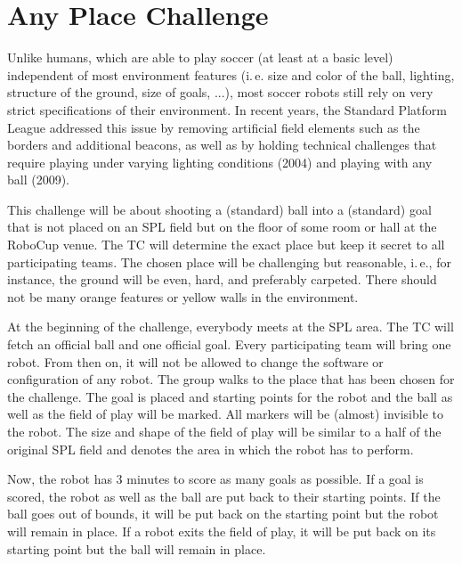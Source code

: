 \documentclass[12pt]{article}
\newcommand{\ie}{\mbox{i.\,e.}\xspace}
\begin{document}
\newpage






\section{Any Place Challenge}

Unlike humans, which are able to play soccer (at least at a basic level) independent of most environment features (\ie size and color of the ball, lighting, structure of the ground, size of goals, ...), most soccer robots still rely on very strict specifications of their environment. In recent years, the Standard Platform League addressed this issue by removing artificial field elements such as the borders and additional beacons, as well as by holding technical challenges that require playing under varying lighting conditions (2004) and playing with any ball (2009).

This challenge will be about shooting a (standard) ball into a (standard) goal that is not placed on an SPL field but on the floor of some room or hall at the RoboCup venue. The TC will determine the exact place but keep it secret to all participating teams. The chosen place will be challenging but reasonable, \ie, for instance, the ground will be even, hard, and preferably carpeted. There should not be many orange features or yellow walls in the environment.

At the beginning of the challenge, everybody meets at the SPL area. The TC will fetch an official ball and one official goal. Every participating team will bring one robot. From then on, it will not be allowed to change the software or configuration of any robot. The group walks to the place that has been chosen for the challenge. The goal is placed and starting points for the robot and the ball as well as the field of play will be marked. All markers will be (almost) invisible to the robot. The size and shape of the field of play will be similar to a half of the original SPL field and denotes the area in which the robot has to perform.

Now, the robot has 3 minutes to score as many goals as possible. If a goal is scored, the robot as well as the ball are put back to their starting points. If the ball goes out of bounds, it will be put back on the starting point but the robot will remain in place. If a robot exits the field of play, it will be put back on its starting point but the ball will remain in place.
\end{document}
